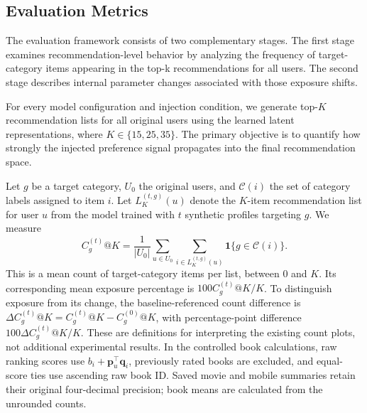 \documentclass[information,article,submit,pdftex,moreauthors]{Definitions/mdpi}
\newif\ifrevisionnotes
\newcommand{\saracomment}[1]{\ifrevisionnotes\par\smallskip\noindent\textcolor{orange}{\textbf{Sara:} #1}\par\smallskip\fi}
\begin{document}
\saracomment{Reconciled the method with the saved run scripts: the mobile SVD uses learning rates 0.012/0.030 and bias regularization 0.002, unlike the controlled book and movie defaults. Documented within-model shared initialization and the separate synthetic-user stream. Replaced unspecified stability language with the concrete paired-baseline repeatability check; cross-seed uncertainty remains unquantified.}

\subsection{Evaluation Metrics}
\label{subsec:eval_metrics}

The evaluation framework consists of two complementary stages. The first stage examines recommendation-level behavior by analyzing the  frequency of target-category items appearing in the top-k recommendations for all users. The second stage describes internal parameter changes associated with those exposure shifts.



For every model configuration and injection condition, we generate top-$K$ recommendation lists for all original users using the learned latent representations, where $K \in \{15,25,35\}$. The primary objective is to quantify how strongly the injected preference signal propagates into the final recommendation space.

Let $g$ be a target category, $U_0$ the original users, and $\mathcal C(i)$ the set of category labels assigned to item $i$. Let $L_K^{(t,g)}(u)$ denote the $K$-item recommendation list for user $u$ from the model trained with $t$ synthetic profiles targeting $g$. We measure
\begin{equation}
\label{eq:target_count}
C_g^{(t)}@K=\frac{1}{|U_0|}\sum_{u\in U_0}
\sum_{i\in L_K^{(t,g)}(u)}\mathbf{1}\{g\in\mathcal C(i)\}.
\end{equation}
This is a mean count of target-category items per list, between 0 and $K$. Its corresponding mean exposure percentage is $100C_g^{(t)}@K/K$. To distinguish exposure from its change, the baseline-referenced count difference is $\Delta C_g^{(t)}@K=C_g^{(t)}@K-C_g^{(0)}@K$, with percentage-point difference $100\Delta C_g^{(t)}@K/K$. These are definitions for interpreting the existing count plots, not additional experimental results. In the controlled book calculations, raw ranking scores use $b_i+\mathbf p_u^\top\mathbf q_i$, previously rated books are excluded, and equal-score ties use ascending raw book ID. Saved movie and mobile summaries retain their original four-decimal precision; book means are calculated from the unrounded counts.
\end{document}
